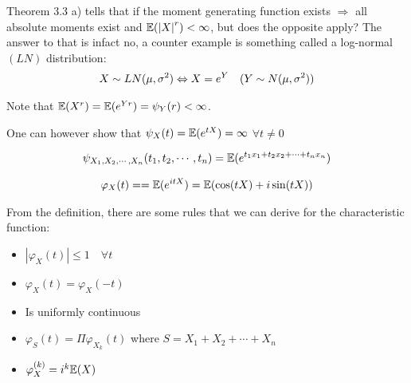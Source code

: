 \par\bigskip
\noindent Theorem 3.3 a) tells that if the moment generating function exists $\Rightarrow$ all absolute moments exist and $\mathbb{E}(\left|X\right|^r)<\infty$, but does the opposite apply? The answer to that is infact no, a counter example is something called a log-normal $(LN)$ distribution:
\begin{equation*}
  \begin{gathered}
    X\sim LN(\mu, \sigma^2)\Leftrightarrow X = e^Y\quad (Y\sim N(\mu,\sigma^2))
  \end{gathered}
\end{equation*}
\par\bigskip
\noindent Note that $\mathbb{E}(X^r) = \mathbb{E}(e^{Yr}) = \psi_Y(r)<\infty$.\par
\noindent One can however show that $\psi_X(t) =\mathbb{E}(e^{tX}) = \infty$ $\forall t\neq0$
\par\bigskip
\begin{theo}{}
  \begin{equation*}
    \begin{gathered}
      \psi_{X_1,X_2,\cdots,X_n}(t_1,t_2,\cdots,t_n) = \mathbb{E}(e^{t_1x_1+t_2x_2+\cdots+t_nx_n})
    \end{gathered}
  \end{equation*}
\end{theo}
\par\bigskip
\begin{theo}{}
  \begin{equation*}
    \begin{gathered}
      \varphi_X(t) == \mathbb{E}(e^{itX}) = \mathbb{E}(\cos(tX)+i\sin(tX))
    \end{gathered}
  \end{equation*}
\end{theo}\par
\noindent From the definition, there are some rules that we can derive for the characteristic function:\par
\begin{itemize}
  \item $\left|\varphi_X(t)\right|\leq 1\quad \forall t$
  \item $\varphi_X(t) = \varphi_X(-t)$
  \item Is uniformly continuous
  \item $\varphi_S(t) = \Pi\varphi_{X_k}(t)$ where $S = X_1+X_2+\cdots+X_n$
  \item $\varphi_X^{(k)} = i^k\mathbb{E}(X)$
\end{itemize}
